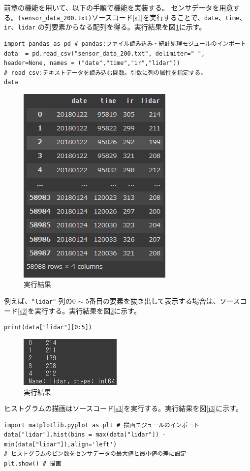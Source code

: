 前章の機能を用いて、以下の手順で機能を実装する。
センサデータを用意する。\verb|(sensor_data_200.txt)|ソースコード\ref{s1}\cite{robo}を実行することで、\verb|date|、\verb|time|、\verb|ir|、\verb|lidar| の列要素からなる配列を得る。実行結果を図\ref{j1}に示す。
  \begin{lstlisting}[caption=センサデータの読み込み,label=s1]
import pandas as pd # pandas:ファイル読み込み・統計処理モジュールのインポート
data  = pd.read_csv("sensor_data_200.txt", delimiter=" ", 
header=None, names = ("date","time","ir","lidar"))
# read_csv:テキストデータを読み込む関数。引数に列の属性を指定する。
data
  \end{lstlisting}
  \begin{figure}[htbp]
    \begin{center}
    \includegraphics[width=.3\linewidth]{img/1.png}
    \caption{実行結果}
    \label{j1}
    \end{center}
  \end{figure}
  例えば、\verb|"lidar"| 列の0 $\sim$ 5番目の要素を抜き出して表示する場合は、ソースコード\ref{s2}\cite{robo}を実行する。実行結果を図\ref{j2}に示す。
  \begin{lstlisting}[caption=要素の抜き出し表示,label=s2]
print(data["lidar"][0:5])
  \end{lstlisting}
  \begin{figure}[htbp]
    \begin{center}
    \includegraphics[width=.3\linewidth]{img/2.png}
    \caption{実行結果}
    \label{j2}
    \end{center}
  \end{figure}

  ヒストグラムの描画はソースコード\ref{s3}\cite{robo}を実行する。実行結果を図\ref{j3}に示す。
  \begin{lstlisting}[caption=ヒストグラムの描画,label=s3]
import matplotlib.pyplot as plt # 描画モジュールのインポート
data["lidar"].hist(bins = max(data["lidar"]) - min(data["lidar"]),align='left')
# ヒストグラムのピン数をセンサデータの最大値と最小値の差に設定
plt.show() # 描画    
  \end{lstlisting}

